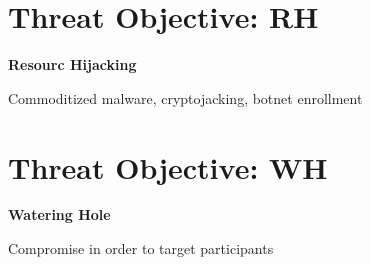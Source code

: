 \documentclass[11pt]{article}
\begin{document}
\section{Threat Objective: RH}

\textbf{Resourc Hijacking}

Commoditized malware,
cryptojacking, 
botnet enrollment

\section{Threat Objective: WH}
\textbf{Watering Hole}

Compromise in order to target participants




\end{document}
